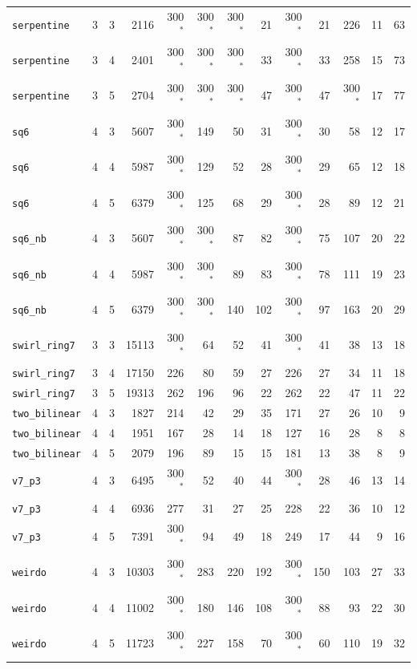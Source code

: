 \documentclass[10pt,a4paper]{article}
\begin{document}
\begin{center}
\begin{tabular}{@{}lccrrrrrrrrrr@{}}
\texttt{serpentine} & 3 & 3 & 2116 & 300$^*$ & 300$^*$ & 300$^*$ & 21 & 300$^*$ & 21 & 226 & 11 & 63 \\
\texttt{serpentine} & 3 & 4 & 2401 & 300$^*$ & 300$^*$ & 300$^*$ & 33 & 300$^*$ & 33 & 258 & 15 & 73 \\
\texttt{serpentine} & 3 & 5 & 2704 & 300$^*$ & 300$^*$ & 300$^*$ & 47 & 300$^*$ & 47 & 300$^*$ & 17 & 77 \\
\texttt{sq6} & 4 & 3 & 5607 & 300$^*$ & 149 & 50 & 31 & 300$^*$ & 30 & 58 & 12 & 17 \\
\texttt{sq6} & 4 & 4 & 5987 & 300$^*$ & 129 & 52 & 28 & 300$^*$ & 29 & 65 & 12 & 18 \\
\texttt{sq6} & 4 & 5 & 6379 & 300$^*$ & 125 & 68 & 29 & 300$^*$ & 28 & 89 & 12 & 21 \\
\texttt{sq6\_nb} & 4 & 3 & 5607 & 300$^*$ & 300$^*$ & 87 & 82 & 300$^*$ & 75 & 107 & 20 & 22 \\
\texttt{sq6\_nb} & 4 & 4 & 5987 & 300$^*$ & 300$^*$ & 89 & 83 & 300$^*$ & 78 & 111 & 19 & 23 \\
\texttt{sq6\_nb} & 4 & 5 & 6379 & 300$^*$ & 300$^*$ & 140 & 102 & 300$^*$ & 97 & 163 & 20 & 29 \\
\texttt{swirl\_ring7} & 3 & 3 & 15113 & 300$^*$ & 64 & 52 & 41 & 300$^*$ & 41 & 38 & 13 & 18 \\
\texttt{swirl\_ring7} & 3 & 4 & 17150 & 226 & 80 & 59 & 27 & 226 & 27 & 34 & 11 & 18 \\
\texttt{swirl\_ring7} & 3 & 5 & 19313 & 262 & 196 & 96 & 22 & 262 & 22 & 47 & 11 & 22 \\
\texttt{two\_bilinear} & 4 & 3 & 1827 & 214 & 42 & 29 & 35 & 171 & 27 & 26 & 10 & 9 \\
\texttt{two\_bilinear} & 4 & 4 & 1951 & 167 & 28 & 14 & 18 & 127 & 16 & 28 & 8 & 8 \\
\texttt{two\_bilinear} & 4 & 5 & 2079 & 196 & 89 & 15 & 15 & 181 & 13 & 38 & 8 & 9 \\
\texttt{v7\_p3} & 4 & 3 & 6495 & 300$^*$ & 52 & 40 & 44 & 300$^*$ & 28 & 46 & 13 & 14 \\
\texttt{v7\_p3} & 4 & 4 & 6936 & 277 & 31 & 27 & 25 & 228 & 22 & 36 & 10 & 12 \\
\texttt{v7\_p3} & 4 & 5 & 7391 & 300$^*$ & 94 & 49 & 18 & 249 & 17 & 44 & 9 & 16 \\
\texttt{weirdo} & 4 & 3 & 10303 & 300$^*$ & 283 & 220 & 192 & 300$^*$ & 150 & 103 & 27 & 33 \\
\texttt{weirdo} & 4 & 4 & 11002 & 300$^*$ & 180 & 146 & 108 & 300$^*$ & 88 & 93 & 22 & 30 \\
\texttt{weirdo} & 4 & 5 & 11723 & 300$^*$ & 227 & 158 & 70 & 300$^*$ & 60 & 110 & 19 & 32 \\
\bottomrule
\end{tabular}
\end{center}
\end{document}
